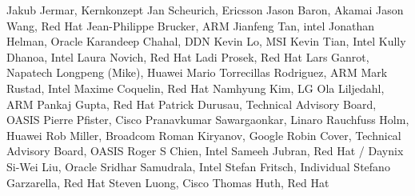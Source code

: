 Jakub Jermar,	Kernkonzept	\newline
Jan Scheurich,	Ericsson	\newline
Jason Baron,	Akamai	\newline
Jason Wang, Red Hat \newline
Jean-Philippe Brucker,	ARM	\newline
Jianfeng Tan,	intel	\newline
Jonathan Helman,	Oracle	\newline
Karandeep Chahal,	DDN	\newline
Kevin Lo,	MSI	\newline
Kevin Tian,	Intel	\newline
Kully Dhanoa,	Intel	\newline
Laura Novich, Red Hat	\newline
Ladi Prosek,	Red Hat	\newline
Lars Ganrot,	Napatech	\newline
Longpeng (Mike),	Huawei	\newline
Mario Torrecillas Rodriguez,	ARM	\newline
Mark Rustad,	Intel	\newline
Maxime Coquelin,	Red Hat	\newline
Namhyung Kim,	LG	\newline
Ola Liljedahl,	ARM	\newline
Pankaj Gupta,	Red Hat	\newline
Patrick Durusau,	Technical Advisory Board, OASIS	\newline
Pierre Pfister,	Cisco	\newline
Pranavkumar Sawargaonkar,	Linaro	\newline
Rauchfuss Holm,	Huawei	\newline
Rob Miller,	Broadcom	\newline
Roman Kiryanov,	Google	\newline
Robin Cover,	Technical Advisory Board, OASIS	\newline
Roger S Chien,	Intel	\newline
Sameeh Jubran,	Red Hat / Daynix	\newline
Si-Wei Liu,	Oracle	\newline
Sridhar Samudrala,	Intel	\newline
Stefan Fritsch,	Individual \newline
Stefano Garzarella,	Red Hat	\newline
Steven Luong,	Cisco	\newline
Thomas Huth,	Red Hat	\newline
